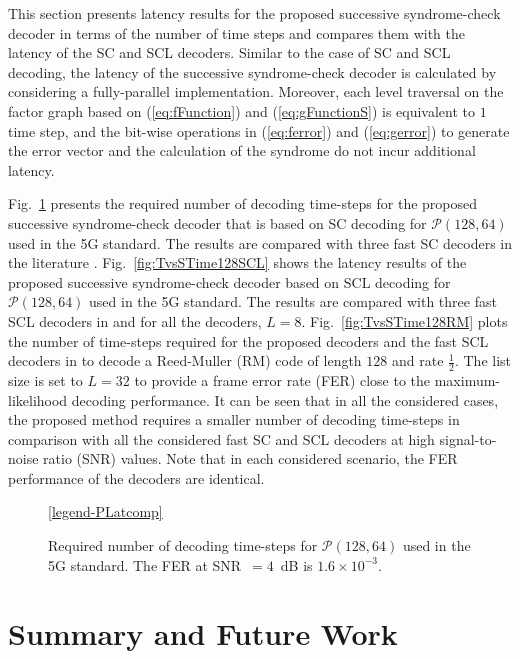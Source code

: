 \documentclass[conference]{IEEEtran}
\begin{document}
This section presents latency results for the proposed successive syndrome-check decoder in terms of the number of time steps and compares them with the latency of the SC and SCL decoders. Similar to the case of SC and SCL decoding, the latency of the successive syndrome-check decoder is calculated by considering a fully-parallel implementation. Moreover, each level traversal on the factor graph based on (\ref{eq:fFunction}) and (\ref{eq:gFunctionS}) is equivalent to $1$ time step, and the bit-wise operations in (\ref{eq:ferror}) and (\ref{eq:gerror}) to generate the error vector and the calculation of the syndrome do not incur additional latency.

Fig.~\ref{fig:TvsSTime128} presents the required number of decoding time-steps for the proposed successive syndrome-check decoder that is based on SC decoding for $\mathcal{P}(128,64)$ used in the 5G standard. The results are compared with three fast SC decoders in the literature \cite{alamdar2011simplified,sarkis2014fast,hanif2017fast}. Fig.~\ref{fig:TvsSTime128SCL} shows the latency results of the proposed successive syndrome-check decoder based on SCL decoding for $\mathcal{P}(128,64)$ used in the 5G standard. The results are compared with three fast SCL decoders in \cite{hashemi2016fast,hashemi2017fast,hanif2018fast} and for all the decoders, $L=8$. Fig.~\ref{fig:TvsSTime128RM} plots the number of time-steps required for the proposed decoders and the fast SCL decoders in \cite{hashemi2016fast,hashemi2017fast,hanif2018fast} to decode a Reed-Muller (RM) code of length $128$ and rate $\frac{1}{2}$. The list size is set to $L=32$ to provide a frame error rate (FER) close to the maximum-likelihood decoding performance. It can be seen that in all the considered cases, the proposed method requires a smaller number of decoding time-steps in comparison with all the considered fast SC and SCL decoders at high signal-to-noise ratio (SNR) values. Note that in each considered scenario, the FER performance of the decoders are identical.

\begin{figure}[t]
    \centering
    
    \ref{legend-PLatcomp}
    \caption{Required number of decoding time-steps for $\mathcal{P}(128,64)$ used in the 5G standard. The FER at SNR~$=4$~dB is $1.6\times 10^{-3}$.}
    \label{fig:TvsSTime128}
\end{figure}

\section{Summary and Future Work}
\end{document}
